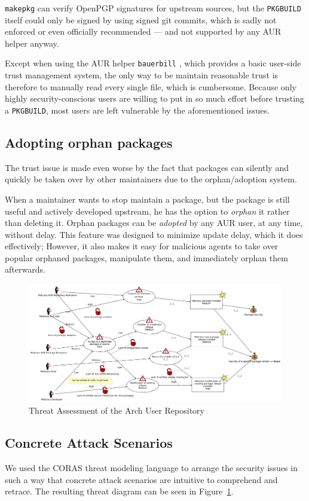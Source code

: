 \texttt{makepkg} can verify OpenPGP signatures for upstream sources, but the \texttt{PKGBUILD} itself could only be signed by using signed git commits, which is sadly not enforced or even officially recommended --- and not supported by any AUR helper anyway.

Except when using the AUR helper \texttt{bauerbill} \cite{bauerbill}, which provides a basic user-side trust management system, the only way to be maintain reasonable trust is therefore to manually read every single file, which is cumbersome.
Because only highly security-conscious users are willing to put in so much effort before trusting a \texttt{PKGBUILD}, most users are left vulnerable by the aforementioned issues.

\subsection*{Adopting orphan packages}
The trust issue is made even worse by the fact that packages can silently and quickly be taken over by other maintainers due to the orphan/adoption system.

When a maintainer wants to stop maintain a package, but the package is still useful and actively developed upstream, he has the option to \emph{orphan} it rather than deleting it.
Orphan packages can be \emph{adopted} by any AUR user, at any time, without delay.
This feature was designed to minimize update delay, which it does effectively; However, it also makes it easy for malicious agents to take over popular orphaned packages, manipulate them, and immediately orphan them afterwards.

\begin{figure}
	\includegraphics[width=\paperwidth]{img/threat.png}
	\caption[Threat Assessment]{Threat Assessment of the Arch User Repository}
	\label{fig:threat}
\end{figure}

\subsection*{Concrete Attack Scenarios}
We used the CORAS \cite{Dahl:2007} threat modeling language to arrange the security issues in such a way that concrete attack scenarios are intuitive to comprehend and retrace. The resulting threat diagram can be seen in Figure~\ref{fig:threat}.

